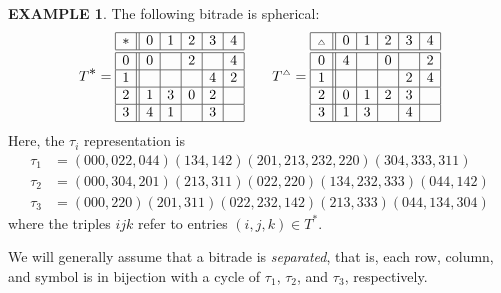 \documentclass[12pt,amstags,fleqn]{article}
\theoremstyle{plain}
\newtheorem{theorem}{Theorem}[section]
\theoremstyle{definition}
\theoremstyle{definition}
\newtheorem{example}[theorem]{EXAMPLE}
\newcommand{\Tidentity}{\textnormal{(T1)}\xspace}
\newcommand{\Tcycledisjoint}{\textnormal{(T2)}\xspace}
\newcommand{\Tfpf}{\textnormal{(T3)}\xspace}
\newcommand{\Ttransitive}{\textnormal{(T4)}\xspace}
\newcommand{\darts}{\Omega}
\def\ll{{\textstyle \ast}}
\def\rr{{\scriptscriptstyle \triangle}}
\newcommand{\opa}{\ll}
\newcommand{\opb}{\rr}
\begin{document}
\begin{example}\label{exspherical}
The following bitrade is spherical:
\begin{align*}
T^{\opa} = 
\begin{array}{|c||c|c|c|c|c|}
\hline
\opa & 0 & 1 & 2 & 3 & 4\\
\hline
 \hline 0 & 0 & ~ & 2 & ~ & 4\\
 \hline 1 & ~ & ~ & ~ & 4 & 2\\
 \hline 2 & 1 & 3 & 0 & 2 & ~\\
 \hline 3 & 4 & 1 & ~ & 3 & ~\\
\hline
\end{array}
& \quad & 
T^{\opb} = 
\begin{array}{|c||c|c|c|c|c|}
\hline
\opb & 0 & 1 & 2 & 3 & 4\\
\hline
 \hline 0 & 4 & ~ & 0 & ~ & 2\\
 \hline 1 & ~ & ~ & ~ & 2 & 4\\
 \hline 2 & 0 & 1 & 2 & 3 & ~\\
 \hline 3 & 1 & 3 & ~ & 4 & ~\\ 
\hline
\end{array}
\end{align*}
Here, the $\tau_i$ representation is
\begin{align*}
\tau_1 &= (000, 022, 044)(134, 142) (201,213,232,220) (304,333,311) \\
\tau_2 &= (000,304,201)(213,311)(022,220)(134,232,333)(044,142) \\
\tau_3 &= (000,220)(201,311)(022,232,142)(213,333)(044,134,304)
\end{align*}
where the triples $ijk$ refer to entries $(i,j,k) \in T^{\opa}$.
\end{example}




We will generally assume that a bitrade is {\em separated}, that is,
each row, column, and symbol is in bijection with a cycle of $\tau_1$,
$\tau_2$, and $\tau_3$, respectively.
\end{document}
